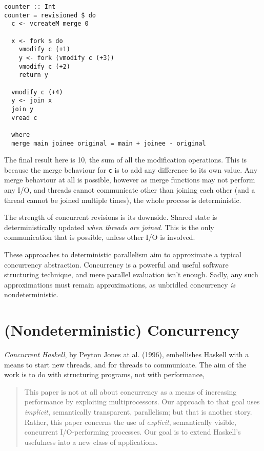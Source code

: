\begin{verbatim}
counter :: Int
counter = revisioned $ do
  c <- vcreateM merge 0

  x <- fork $ do
    vmodify c (+1)
    y <- fork (vmodify c (+3))
    vmodify c (+2)
    return y

  vmodify c (+4)
  y <- join x
  join y
  vread c

  where
  merge main joinee original = main + joinee - original
\end{verbatim}

The final result here is 10, the sum of all the modification
operations. This is because the merge behaviour for \verb|c| is to add
any difference to its own value. Any merge behaviour at all is
possible, however as merge functions may not perform any I/O, and
threads cannot communicate other than joining each other (and a thread
cannot be joined multiple times), the whole process is deterministic.

The strength of concurrent revisions is its downside. Shared state is
deterministically updated \textit{when threads are joined}. This is
the only communication that is possible, unless other I/O is involved.

These approaches to deterministic parallelism aim to approximate a
typical concurrency abstraction. Concurrency is a powerful and useful
software structuring technique, and mere parallel evaluation isn't
enough. Sadly, any such approximations must remain approximations, as
unbridled concurrency \textit{is} nondeterministic.

\section{(Nondeterministic) Concurrency}
\label{sec:litrev-conc}

\textit{Concurrent Haskell}, by Peyton Jones at
al. (1996)\nocite{concurrent}, embellishes Haskell with a means to
start new threads, and for threads to communicate. The aim of the work
is to do with structuring programs, not with performance,

\begin{quote}
  This paper is not at all about concurrency as a means of increasing
  performance by exploiting multiprocessors. Our approach to that goal
  uses \textit{implicit}, semantically transparent, parallelism; but
  that is another story. Rather, this paper concerns the use of
  \textit{explicit}, semantically visible, concurrent I/O-performing
  processes. Our goal is to extend Haskell's usefulness into a new
  class of applications.\cite{concurrent}
\end{quote}

